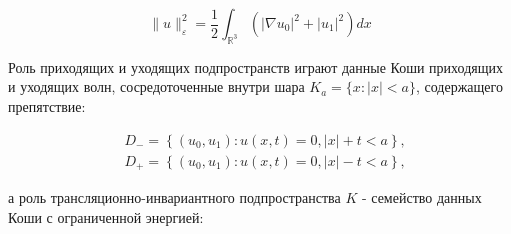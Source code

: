 \documentclass[10pt]{article}
\begin{document}
\[

\|u\|_{\varepsilon}^{2}=\frac{1}{2} \int_{\mathbb{R}^{3}}\left(\left|\nabla u_{0}\right|^{2}+\left|u_{1}\right|^{2}\right) d x

\]



Роль приходящих и уходящих подпространств играют данные Коши приходящих и уходящих волн, сосредоточенные внутри шара $K_{a}=\{x:|x|<a\}$, содержащего препятствие:



\[

\begin{aligned}

& D_{-}=\left\{\left(u_{0}, u_{1}\right): u(x, t)=0,|x|+t<a\right\}, \\

& D_{+}=\left\{\left(u_{0}, u_{1}\right): u(x, t)=0,|x|-t<a\right\},

\end{aligned}

\]



а роль трансляционно-инвариантного подпространства $K$ - семейство данных Коши с ограниченной энергией:
\end{document}
